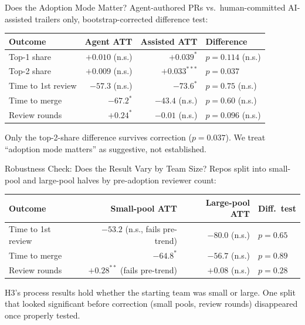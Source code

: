 \begin{frame}{Does the Adoption Mode Matter?}
Agent-authored PRs vs.\ human-committed AI-assisted trailers only,
bootstrap-corrected difference test:
\begin{table}
\centering
\scriptsize
\begin{tabular}{lrrl}
\toprule
Outcome & Agent ATT & Assisted ATT & Difference \\
\midrule
Top-1 share    & $+0.010$ (n.s.) & $+0.039^{*}$    & $p=0.114$ (n.s.) \\
Top-2 share    & $+0.009$ (n.s.) & $+0.033^{***}$  & $p=0.037$ \\
Time to 1st review & $-57.3$ (n.s.) & $-73.6^{*}$  & $p=0.75$ (n.s.) \\
Time to merge  & $-67.2^{*}$     & $-43.4$ (n.s.)  & $p=0.60$ (n.s.) \\
Review rounds  & $+0.24^{*}$     & $-0.01$ (n.s.)  & $p=0.096$ (n.s.) \\
\bottomrule
\end{tabular}
\end{table}
Only the top-2-share difference survives correction ($p=0.037$). We
treat ``adoption mode matters'' as suggestive, not established.
\end{frame}

\begin{frame}{Robustness Check: Does the Result Vary by Team Size?}
Repos split into small-pool and large-pool halves by pre-adoption
reviewer count:
\begin{table}
\centering
\scriptsize
\begin{tabular}{lrrl}
\toprule
Outcome & Small-pool ATT & Large-pool ATT & Diff.\ test \\
\midrule
Time to 1st review & $-53.2$ (n.s., fails pre-trend) & $-80.0$ (n.s.) & $p=0.65$ \\
Time to merge      & $-64.8^{*}$                     & $-56.7$ (n.s.) & $p=0.89$ \\
Review rounds      & $+0.28^{**}$ (fails pre-trend)  & $+0.08$ (n.s.) & $p=0.28$ \\
\bottomrule
\end{tabular}
\end{table}
H3's process results hold whether the starting team was small or large.
One split that looked significant before correction (small pools,
review rounds) disappeared once properly tested.
\end{frame}